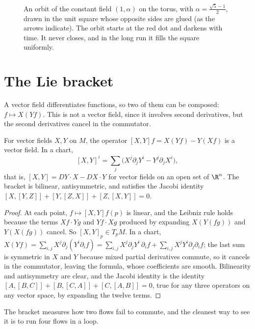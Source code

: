 \begin{figure}[ht]
\centering
{}
\caption{An orbit of the constant field $(1,\alpha)$ on the torus, with $\alpha=\frac{\sqrt5-1}2$, drawn in the unit square whose opposite sides are glued
(as the arrows indicate). The orbit starts at the red dot and darkens with time. It never closes, and in the long run it fills the square uniformly.}
\label{fig:torusflow}
\end{figure}

\section{The Lie bracket}

A vector field differentiates functions, so two of them can be composed: $f\mapsto X(Yf)$. This is not a vector field, since it involves second
derivatives, but the second derivatives cancel in the commutator.

\begin{proposition}\label{prop:bracket}
For vector fields $X,Y$ on $M$, the operator $[X,Y]f=X(Yf)-Y(Xf)$ is a vector field. In a chart,
\[
[X,Y]^i=\sum_j\bigl(X^j\partial_jY^i-Y^j\partial_jX^i\bigr),
\]
that is, $[X,Y]=DY\cdot X-DX\cdot Y$ for vector fields on an open set of $\R^n$. The bracket is bilinear, antisymmetric, and satisfies the Jacobi identity
$[X,[Y,Z]]+[Y,[Z,X]]+[Z,[X,Y]]=0$.
\end{proposition}
\begin{proof}
At each point, $f\mapsto[X,Y]f(p)$ is linear, and the Leibniz rule holds because the terms $Xf\cdot Yg$ and $Yf\cdot Xg$ produced by expanding
$X(Y(fg))$ and $Y(X(fg))$ cancel. So $[X,Y]_p\in T_pM$. In a chart, $X(Yf)=\sum_{i,j}X^j\partial_j(Y^i\partial_if)=\sum_{i,j}X^j\partial_jY^i\,\partial_if+\sum_{i,j}X^jY^i\partial_j\partial_if$; the last
sum is symmetric in $X$ and $Y$ because mixed partial derivatives commute, so it cancels in the commutator, leaving the formula, whose coefficients are
smooth. Bilinearity and antisymmetry are clear, and the Jacobi identity is the identity $[A,[B,C]]+[B,[C,A]]+[C,[A,B]]=0$, true for any three operators
on any vector space, by expanding the twelve terms.
\end{proof}

The bracket measures how two flows fail to commute, and the cleanest way to see it is to run four flows in a loop.


